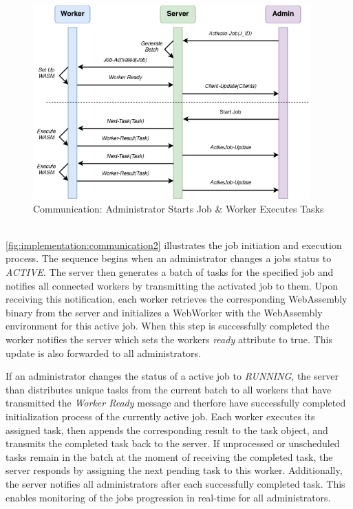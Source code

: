 \begin{figure}[htbp]
    \centering
    \includegraphics[width=0.95\textwidth]{gfx/figures/communication-jobexecution.png}
    \caption{Communication: Administrator Starts Job \& Worker Executes Tasks}
    \label{fig:implementation:communication2}
\end{figure}
~\\
\autoref{fig:implementation:communication2} illustrates the job initiation and execution process. The sequence begins when an administrator changes a jobs status to \emph{ACTIVE}. The server then generates a batch of tasks for the specified job and notifies all connected workers by transmitting the activated job to them. Upon receiving this notification, each worker retrieves the corresponding WebAssembly binary from the server and initializes a WebWorker with the WebAssembly environment for this active job. When this step is successfully completed the worker notifies the server which sets the workers \emph{ready} attribute to true. This update is also forwarded to all administrators.

If an administrator changes the status of a active job to \emph{RUNNING}, the server than distributes unique tasks from the current batch to all workers that have transmitted the \emph{Worker Ready} message and therfore have successfully completed initialization process of the currently active job. Each worker executes its assigned task, then appends the corresponding result to the task object, and transmits the completed task back to the server. If unprocessed or unscheduled tasks remain in the batch at the moment of receiving the completed task, the server responds by assigning the next pending task to this worker. Additionally, the server notifies all administrators after each successfully completed task. This enables monitoring of the jobs progression in real-time for all administrators.

